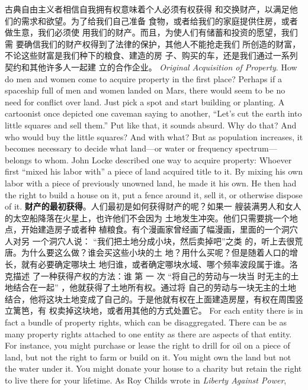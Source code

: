 \begin{paracol}{2}
\switchcolumn
古典自由主义者相信自我拥有权意味着个人必须有权获得
和交换财产，以满足他们的需求和欲望。为了给我们自己准备
食物，或者给我们的家庭提供住房，或者做生意，我们必须使
用我们的财产。而且，为使人们有储蓄和投资的愿望，我们需
要确信我们的财产权得到了法律的保护，其他人不能抢走我们
所创造的财富，不论这些财富是我们种下的粮食、建造的房
子、购买的车，还是我们通过一系列契约和其他许多人一起建
立的合作企业。
\switchcolumn*
\textit{Original Acquisition of Property}. How do men and women come
to acquire property in the first place? Perhaps if a spaceship full
of men and women landed on Mars, there would seem to be no
need for conflict over land. Just pick a spot and start building or
planting. A cartoonist once depicted one caveman saying to another, ``Let's cut the earth into little squares and sell them.'' Put
like that, it sounds absurd. Why do that? And who would buy
the little squares? And with what? But as population increases,
it becomes necessary to decide what land---or water or frequency spectrum---belongs to whom. John Locke described
one way to acquire property: Whoever first ``mixed his labor
with'' a piece of land acquired title to it. By mixing his own
labor with a piece of previously unowned land, he made it his
own. He then had the right to build a house on it, put a fence
around it, sell it, or otherwise dispose of it.
\switchcolumn
\textbf{财产的最初获得}。人们最初是如何获得财产的呢？如果一
艘装满男人和女人的太空船降落在火星上，也许他们不会因为
土地发生冲突。他们只需要挑一个地点，开始建造房子或者种
植粮食。有个漫画家曾经画了幅漫画，里面的一个洞穴人对另
一个洞穴人说： “我们把土地分成小块，然后卖掉吧”之类
的，听上去很荒唐。为什么要这么做？谁会买这些小块的土
地？用什么买呢？但是随着人口的增长，就有必要确定哪块土
地归谁，或者确定哪块水域、哪个频率波段属于谁。洛克描述
了一种获得产权的方法：谁 第 一 次 “将自己的劳动与一块当
时无主的土地结合在一起” ，他就获得了土地所有权。通过将
自己的劳动与一块无主的土地结合，他将这块土地变成了自己的。于是他就有权在上面建造房屋，有权在周围竖立篱笆，有
权卖掉这块地，或者用其他的方式处置它。
\switchcolumn*
For each entity there is in fact a bundle of property rights,
which can be disaggregated. There can be as many property
rights attached to one entity as there are aspects of that entity.
For instance, you might purchase or lease the right to drill for
oil on a piece of land, but not the right to farm or build on it.
You might own the land but not the water under it. You might
donate your house to a charity but retain the right to live there
for your lifetime. As Roy Childs wrote in \textit{Liberty Against Power},

\end{paracol}

